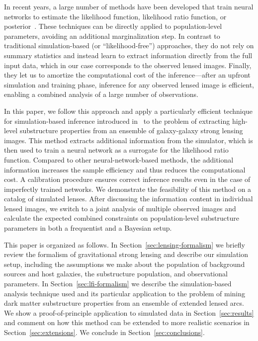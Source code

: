 \documentclass[twocolumn]{aastex63}
\begin{document}
In recent years, a large number of methods have been developed that train neural networks to estimate the likelihood function, likelihood ratio function, or posterior~\citep{2012arXiv1212.1479F, 2014arXiv1410.8516D, 2015arXiv150203509G, 2015arXiv150505770J, Cranmer:2015bka,  2016arXiv160508803D, 2016arXiv160206701P, NIPS2016_6084, 2016arXiv161110242D, 2016arXiv160502226U,  2016arXiv160605328V, 2016arXiv160903499V, 2016arXiv160106759V, 2017arXiv170208896T, 2017arXiv170507057P, 2017arXiv170707113L, 2017arXiv171101861L, gutmann2017likelihood, DBLP:journals/corr/abs-1806-07366, 2018arXiv181009899D, 2018arXiv181001367G, 2018arXiv180400779H, 2018arXiv180703039K, 2018arXiv180509294L, 2018arXiv180507226P, Alsing:2019xrx, Hermans:2019ioj}. These techniques can be directly applied to population-level parameters, avoiding an additional marginalization step. In contrast to traditional simulation-based (or ``likelihood-free'') approaches, they do not rely on summary statistics and instead learn to extract information directly from the full input data, which in our case corresponds to the observed lensed images. Finally, they let us to amortize the computational cost of the inference---after an upfront simulation and training phase, inference for any observed lensed image is efficient, enabling a combined analysis of a large number of observations.

In this paper, we follow this approach and apply a particularly efficient technique for simulation-based inference introduced in~\citet{1805.00013, 1805.00020, 1805.12244, Stoye:2018ovl} to the problem of extracting high-level substructure properties from an ensemble of galaxy-galaxy strong lensing images. This method extracts additional information from the simulator, which is then used to train a neural network as a surrogate for the likelihood ratio function. Compared to other neural-network-based methods, the additional information increases the sample efficiency and thus reduces the computational cost. A calibration procedure ensures correct inference results even in the case of imperfectly trained networks. We demonstrate the feasibility of this method on a catalog of simulated lenses. After discussing the information content in individual lensed images, we switch to a joint analysis of multiple observed images and calculate the expected combined constraints on population-level substructure parameters in both a frequentist and a Bayesian setup.

This paper is organized as follows. In Section~\ref{sec:lensing-formalism} we briefly review the formalism of gravitational strong lensing and describe our simulation setup, including the assumptions we make about the population of background sources and host galaxies, the substructure population, and observational parameters. In Section~\ref{sec:lfi-formalism} we describe the simulation-based analysis technique used and its particular application to the problem of mining dark matter substructure properties from an ensemble of extended lensed arcs. We show a proof-of-principle application to simulated data in Section~\ref{sec:results} and comment on how this method can be extended to more realistic scenarios in Section~\ref{sec:extensions}. We conclude in Section~\ref{sec:conclusions}.
\end{document}

